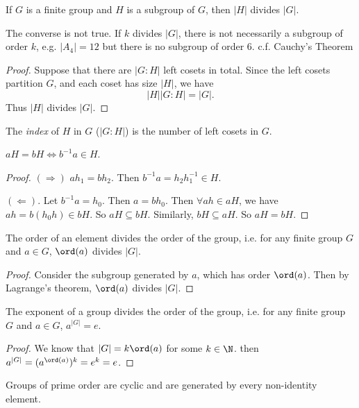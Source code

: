 \documentclass[a4pape]{article}
\begin{document}
\begin{thm}
  If $G$ is a finite group and $H$ is a subgroup of $G$, then $|H|$ divides $|G|$.
\end{thm}
\note The converse is not true. If $k$ divides $|G|$, there is not necessarily a subgroup of order $k$, e.g. $|A_4| = 12$ but there is no subgroup of order $6$. c.f. Cauchy's Theorem

\begin{proof}
  Suppose that there are $|G: H|$ left cosets in total. Since the left cosets partition $G$, and each coset has size $|H|$, we have
  \[
  |H||G:H| = |G|.
  \]
Thus $|H|$ divides $|G|$.
\end{proof}

\begin{defi}
  The \emph{index} of $H$ in $G$ ($|G:H|$) is the number of left cosets in $G$. 
\end{defi}

\begin{prop}
  $aH = bH \Leftrightarrow b^{-1}a\in H$.
\end{prop}
\begin{proof}
  $(\Rightarrow)$ $ah_1 = bh_2$. Then $b^{-1}a = h_2h_1^{-1}\in H$.

  $(\Leftarrow)$. Let $b^{-1}a = h_0$. Then $a = bh_0$. Then $\forall ah\in aH$, we have $ah = b(h_0h)\in bH$. So $aH \subseteq bH$. Similarly, $bH\subseteq aH$. So $aH = bH$.
\end{proof}

\begin{cor}
  The order of an element divides the order of the group, i.e. for any finite group $G$ and $a\in G$, $\ord(a)$ divides $|G|$.
\end{cor}
\begin{proof}
  Consider the subgroup generated by $a$, which has order $\ord(a)$. Then by Lagrange's theorem, $\ord(a)$ divides $|G|$.
\end{proof}

\begin{cor}
  The exponent of a group divides the order of the group, i.e. for any finite group $G$ and $a\in G$, $a^{|G|} = e$.
\end{cor}

\begin{proof}
  We know that $|G| = k\ord(a)$ for some $k\in \N$. then $a^{|G|} = (a^{\ord(a)})^k = e^k = e$.
\end{proof}

\begin{cor}
  Groups of prime order are cyclic and are generated by every non-identity element.
\end{cor}
\end{document}
